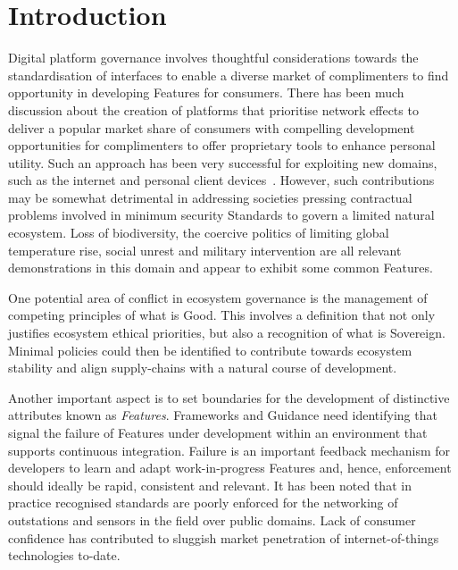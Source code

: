 \documentclass[11pt, oneside]{article}   	%
\begin{document}
\newpage

\tableofcontents

\newpage
\thispagestyle{empty}
\mbox{}
\newpage

\section{Introduction}
Digital platform governance involves thoughtful considerations towards the standardisation of interfaces to enable a diverse market of complimenters to find opportunity in developing Features for consumers.
There has been much discussion about the creation of platforms that prioritise network effects to deliver a popular market share of consumers with compelling development opportunities for complimenters to offer proprietary tools to enhance personal utility.
Such an approach has been very successful for exploiting new domains, such as the internet and personal client devices~\cite{bop1}.
However, such contributions may be somewhat detrimental in addressing societies pressing contractual problems involved in minimum security Standards to govern a limited natural ecosystem.
Loss of biodiversity, the coercive politics of limiting global temperature rise, social unrest and military intervention are all relevant demonstrations in this domain and appear to exhibit some common Features.\

One potential area of conflict in ecosystem governance is the management of competing principles of what is Good.
This involves a definition that not only justifies ecosystem ethical priorities, but also a recognition of what is Sovereign.
Minimal policies could then be identified to contribute towards ecosystem stability and align supply-chains with a natural course of development.\

Another important aspect is to set boundaries for the development of distinctive attributes known as \emph{Features}.
Frameworks and Guidance need identifying that signal the failure of Features under development within an environment that supports continuous integration.
Failure is an important feedback mechanism for developers to learn and adapt work-in-progress Features and, hence, enforcement should ideally be rapid, consistent and relevant.
It has been noted that in practice recognised standards are poorly enforced for the networking of outstations and sensors in the field over public domains.
Lack of consumer confidence has contributed to sluggish market penetration of internet-of-things technologies to-date.\
\end{document}

